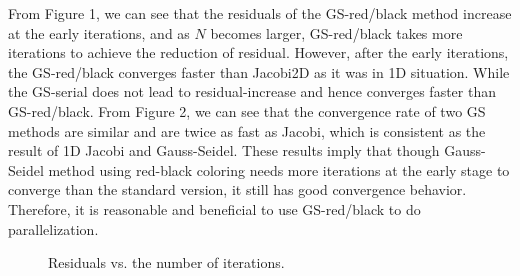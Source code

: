 \documentclass[11pt, oneside]{article}   	%
\begin{document}
From Figure 1, we can see that the residuals of the GS-red/black method increase at the early iterations, and as $N$ becomes larger, GS-red/black takes more iterations to achieve the reduction of residual. However, after the early iterations, the GS-red/black converges faster than Jacobi2D as it was in 1D situation. While the GS-serial does not lead to residual-increase and hence converges faster than GS-red/black. From Figure 2, we can see that the convergence rate of two GS methods are similar and are twice as fast as Jacobi, which is consistent as the result of 1D Jacobi and Gauss-Seidel. These results imply that though Gauss-Seidel method using red-black coloring needs more iterations at the early stage to converge than the standard version, it still has good convergence behavior. Therefore, it is reasonable and beneficial to use GS-red/black to do parallelization.
\begin{figure}[ht]
\caption{Residuals vs. the number of iterations.}
\end{figure}
\end{document}

